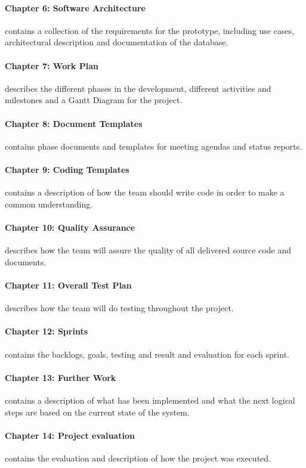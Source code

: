 \paragraph{Chapter 6: Software Architecture} contains a collection of the requirements for the prototype, including use cases, architectural description and documentation of the database.

\paragraph{Chapter 7: Work Plan} describes the different phases in the development, different activities and milestones and a Gantt Diagram for the project.

\paragraph{Chapter 8: Document Templates} contains phase documents and templates for meeting agendas and status reports.

\paragraph{Chapter 9: Coding Templates} contains a description of how the team should write code in order to make a common understanding.

\paragraph{Chapter 10: Quality Assurance} describes how the team will assure the quality of all delivered source code and documents. 

\paragraph{Chapter 11: Overall Test Plan} describes how the team will do testing throughout the project.

\paragraph{Chapter 12: Sprints} contains the backlogs, goals, testing and result and evaluation for each sprint. 

\paragraph{Chapter 13: Further Work} contains a description of what has been implemented and what the next logical steps are based on the current state of the system.

\paragraph{Chapter 14: Project evaluation} contains the evaluation and description of how the project was executed.